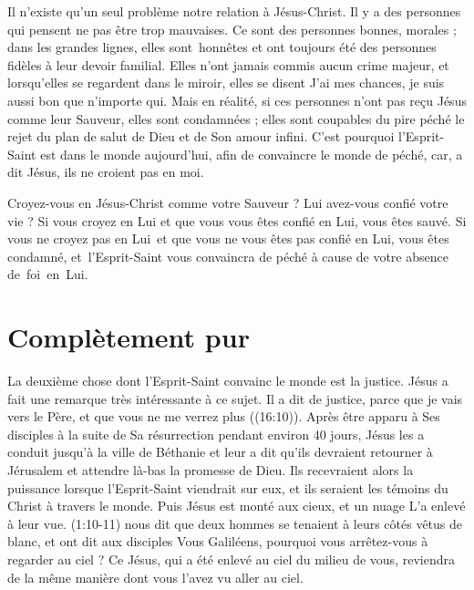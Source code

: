 Il n'existe qu'un seul problème\frcolon{} notre relation à Jésus-Christ.
 Il y a des personnes qui pensent ne pas être trop mauvaises.
 Ce sont des personnes bonnes, morales ; dans les grandes lignes,
 elles sont~honnêtes et ont toujours été des personnes fidèles
 à leur devoir familial. Elles n'ont jamais commis aucun crime majeur,
 et lorsqu'elles se regardent dans le miroir, elles se disent\frcolon{}
 \Og  J'ai mes chances, je suis aussi bon que n'importe qui. \Fg{}
 Mais en réalité, si ces personnes n'ont pas reçu Jésus comme leur Sauveur,
 elles sont condamnées ; elles sont coupables du pire péché
 \ocadr le rejet du plan de salut de Dieu et de Son amour infini.
 C'est pourquoi l'Esprit-Saint est dans le monde aujourd'hui,
 afin de convaincre le monde de péché,
 \Og car, a dit Jésus, ils ne croient pas en moi. \Fg{}

Croyez-vous en Jésus-Christ comme votre Sauveur ?
 Lui avez-vous confié votre vie ? Si vous croyez en Lui et que vous vous êtes
 confié en Lui, vous êtes sauvé.
 Si vous ne croyez pas en Lui~et que vous ne vous êtes pas confié en Lui,
 vous êtes condamné, et~l'Esprit-Saint vous convaincra de péché
 à cause de votre absence de~foi~en~Lui. %

\pagebreak


\section{Compl\`etement pur}

La deuxième chose dont l'Esprit-Saint convainc le monde est la justice.
 Jésus a fait une remarque très intéressante à ce sujet. Il a dit\frcolon{}
 \Og [\dots{}] de justice, parce que je vais vers le Père,
 et que vous ne me verrez plus \Fg{} ((16:10)).
 Après être apparu à Ses disciples à la suite de Sa résurrection
 pendant environ 40 jours, Jésus les a conduit jusqu'à la ville
 de Béthanie et leur a dit qu'ils devraient retourner à Jérusalem
 et attendre là-bas la promesse de Dieu.
 Ils recevraient alors la puissance lorsque l'Esprit-Saint viendrait sur eux,
 et ils seraient les témoins du Christ à travers le monde.
 Puis Jésus est monté aux cieux, et un nuage L'a enlevé à leur vue.
 (1:10-11) nous dit que deux hommes se tenaient à leurs côtés
 vêtus de blanc, et ont dit aux disciples\frcolon{}
 \Og Vous Galiléens, pourquoi vous arrêtez-vous à regarder au ciel ?
 Ce Jésus, qui a été enlevé au ciel du milieu de vous,
 reviendra de la même manière dont vous l'avez vu aller au ciel. \Fg{}

